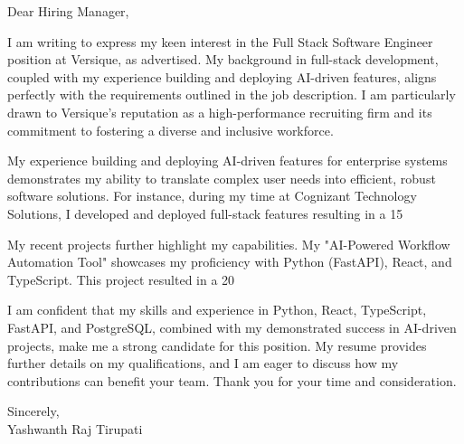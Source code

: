 \documentclass[letterpaper,11pt]{article}
\begin{document}
\begin{flushleft}
Dear Hiring Manager,

\vspace{12pt}

I am writing to express my keen interest in the Full Stack Software Engineer position at Versique, as advertised.  My background in full-stack development, coupled with my experience building and deploying AI-driven features, aligns perfectly with the requirements outlined in the job description. I am particularly drawn to Versique's reputation as a high-performance recruiting firm and its commitment to fostering a diverse and inclusive workforce.

\vspace{12pt}

My experience building and deploying AI-driven features for enterprise systems demonstrates my ability to translate complex user needs into efficient, robust software solutions.  For instance, during my time at Cognizant Technology Solutions, I developed and deployed full-stack features resulting in a 15%

\vspace{12pt}

My recent projects further highlight my capabilities.  My "AI-Powered Workflow Automation Tool" showcases my proficiency with Python (FastAPI), React, and TypeScript. This project resulted in a 20%

\vspace{12pt}

I am confident that my skills and experience in Python, React, TypeScript, FastAPI, and PostgreSQL, combined with my demonstrated success in AI-driven projects, make me a strong candidate for this position. My resume provides further details on my qualifications, and I am eager to discuss how my contributions can benefit your team.  Thank you for your time and consideration.

\vspace{20pt}

Sincerely, \\
Yashwanth Raj Tirupati

\end{flushleft}
\end{document}
